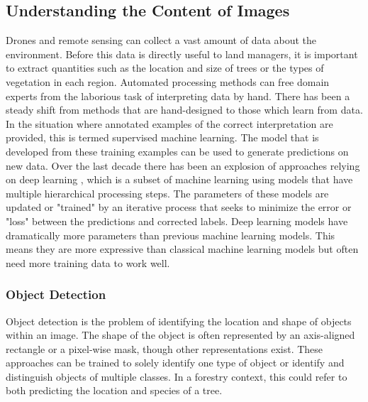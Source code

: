 \subsection{Understanding the Content of Images}
Drones and remote sensing can collect a vast amount of data about the environment. Before this data is directly useful to land managers, it is important to extract quantities such as the location and size of trees or the types of vegetation in each region. Automated processing methods can free domain experts from the laborious task of interpreting data by hand. There has been a steady shift from methods that are hand-designed to those which learn from data. In the situation where annotated examples of the correct interpretation are provided, this is termed supervised machine learning. 
The model that is developed from these training examples can be used to generate predictions on new data. Over the last decade there has been an explosion of approaches relying on deep learning \cite{Lecun2015DeepLearning}, which is a subset of machine learning using models that have multiple hierarchical processing steps. 
The parameters of these models are updated or "trained" by an iterative process that seeks to minimize the error or "loss" between the predictions and corrected labels. 
Deep learning models have dramatically more parameters than previous machine learning models. This means they are more expressive than classical machine learning models but often need more training data to work well. 

\subsubsection{Object Detection}
Object detection is the problem of identifying the location and shape of objects within an image. The shape of the object is often represented by an axis-aligned rectangle or a pixel-wise mask, though other representations exist. These approaches can be trained to solely identify one type of object or identify and distinguish objects of multiple classes. In a forestry context, this could refer to both predicting the location and species of a tree. 

